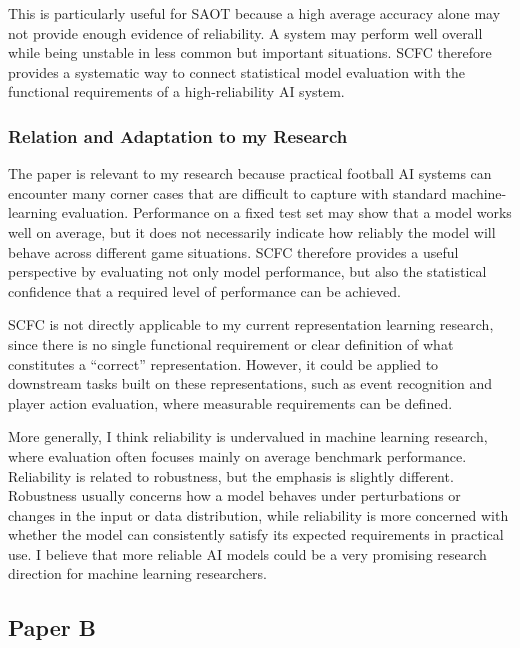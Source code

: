     This is particularly useful for SAOT because a high average accuracy alone may not provide enough evidence of reliability. A system may perform well overall while being unstable in less common but important situations. SCFC therefore provides a systematic way to connect statistical model evaluation with the functional requirements of a high-reliability AI system.
    
        
    \subsubsection{Relation and Adaptation to my Research}
    
    The paper is relevant to my research because practical football AI systems can encounter many corner cases that are difficult to capture with standard machine-learning evaluation. Performance on a fixed test set may show that a model works well on average, but it does not necessarily indicate how reliably the model will behave across different game situations. SCFC therefore provides a useful perspective by evaluating not only model performance, but also the statistical confidence that a required level of performance can be achieved.
    
    SCFC is not directly applicable to my current representation learning research, since there is no single functional requirement or clear definition of what constitutes a ``correct'' representation. However, it could be applied to downstream tasks built on these representations, such as event recognition and player action evaluation, where measurable requirements can be defined.
    
    More generally, I think reliability is undervalued in machine learning research, where evaluation often focuses mainly on average benchmark performance. Reliability is related to robustness, but the emphasis is slightly different. Robustness usually concerns how a model behaves under perturbations or changes in the input or data distribution, while reliability is more concerned with whether the model can consistently satisfy its expected requirements in practical use. I believe that more reliable AI models could be a very promising research direction for machine learning researchers.


\subsection{Paper B}

